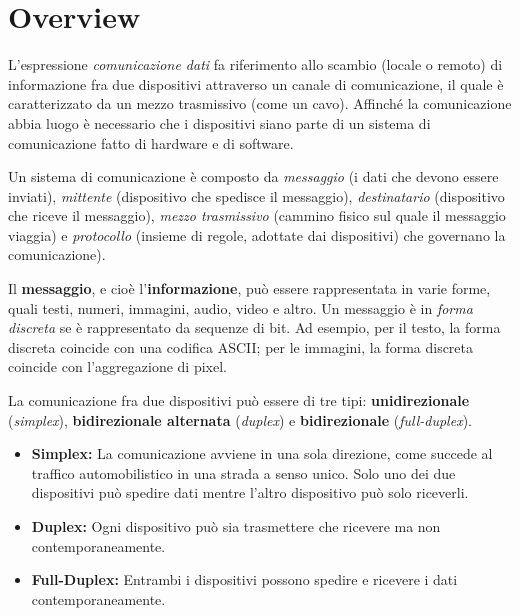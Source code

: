 \section{Overview}
    L’espressione \textit{comunicazione dati} fa riferimento allo scambio (locale o remoto) di informazione fra due dispositivi attraverso un canale di comunicazione, il quale è caratterizzato da un mezzo trasmissivo (come un cavo). Affinché la comunicazione abbia luogo è necessario che i dispositivi siano parte di un sistema di comunicazione fatto di hardware e di software.

    \vspace{3mm}
    
    Un sistema di comunicazione è composto da \textit{messaggio} (i dati che devono essere inviati), \textit{mittente} (dispositivo che spedisce il messaggio), \textit{destinatario} (dispositivo che riceve il messaggio), \textit{mezzo trasmissivo} (cammino fisico sul quale il messaggio viaggia) e \textit{protocollo} (insieme di regole, adottate dai dispositivi) che governano la comunicazione).
    
    \vspace{3mm}
    
    Il \textbf{messaggio}, e cioè l'\textbf{informazione}, può essere rappresentata in varie forme, quali testi, numeri, immagini, audio, video e altro. Un messaggio è in \textit{forma discreta} se è rappresentato da sequenze di bit. Ad esempio, per il testo, la forma discreta coincide con una codifica ASCII; per le immagini, la forma discreta coincide con l'aggregazione di pixel.
    
    \vspace{3mm}
    
    La comunicazione fra due dispositivi può essere di tre tipi: \textbf{unidirezionale} (\textit{simplex}), \textbf{bidirezionale alternata} (\textit{duplex}) e \textbf{bidirezionale} (\textit{full-duplex}).
    
    \begin{itemize}
        \item 
        \textbf{Simplex:} La comunicazione avviene in una sola direzione, come succede al traffico automobilistico in una strada a senso unico. Solo uno dei due dispositivi può spedire dati mentre l’altro dispositivo può solo riceverli.
    
        \item
        \textbf{Duplex:} Ogni dispositivo può sia trasmettere che ricevere ma non contemporaneamente.
        
        \item
        \textbf{Full-Duplex:} Entrambi i dispositivi possono spedire e ricevere i dati contemporaneamente.
    \end{itemize}
    
